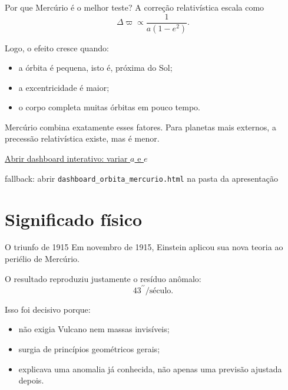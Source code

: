 \documentclass[aspectratio=169,10pt]{beamer}
\newcommand{\arcsec}{^{\prime\prime}}
\begin{document}
\begin{frame}{Por que Mercúrio é o melhor teste?}
  A correção relativística escala como
  \[
    \Delta\varpi \propto \frac{1}{a(1-e^2)}.
  \]

  \vspace{0.3cm}
  Logo, o efeito cresce quando:
  \begin{itemize}
    \item a órbita é pequena, isto é, próxima do Sol;
    \item a excentricidade é maior;
    \item o corpo completa muitas órbitas em pouco tempo.
  \end{itemize}

  \vspace{0.35cm}
  Mercúrio combina exatamente esses fatores. Para planetas mais externos, a precessão relativística existe, mas é menor.

  \vspace{0.3cm}
  {\color{MercuryAccent}
  \href{dashboard_orbita_mercurio.html}{Abrir dashboard interativo: variar $a$ e $e$}}

  \vspace{0.12cm}
  {\tiny\color{MercuryMuted}
  fallback: abrir \texttt{dashboard\_orbita\_mercurio.html} na pasta da apresentação}
\end{frame}

\section{Significado físico}

\begin{frame}{O triunfo de 1915}
  Em novembro de 1915, Einstein aplicou sua nova teoria ao periélio de Mercúrio.

  \vspace{0.35cm}
  O resultado reproduziu justamente o resíduo anômalo:
  \[
    43\arcsec/\text{século}.
  \]

  \vspace{0.35cm}
  Isso foi decisivo porque:
  \begin{itemize}
    \item não exigia Vulcano nem massas invisíveis;
    \item surgia de princípios geométricos gerais;
    \item explicava uma anomalia já conhecida, não apenas uma previsão ajustada depois.
  \end{itemize}
\end{frame}
\end{document}
